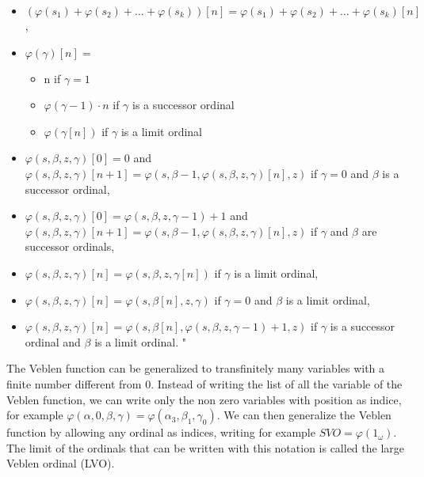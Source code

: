 \documentclass[10pt]{article}
\begin{document}
\begin{itemize}
     \setlength{\itemsep}{1pt}
     \setlength{\parskip}{0pt}
     \setlength{\parsep}{0pt}

\item \((\varphi(s_1)+\varphi(s_2)+\ldots+\varphi(s_k))[n]=\varphi(s_1)+\varphi(s_2)+\ldots+\varphi(s_k)[n]\),
\item \(\varphi(\gamma)[n]=\)
\begin{itemize}
     \setlength{\itemsep}{1pt}
     \setlength{\parskip}{0pt}
     \setlength{\parsep}{0pt}
\item n if \( \gamma=1 \)
\item \(\varphi(\gamma-1)\cdot n \) if \( \gamma \) is a successor ordinal
\item \( \varphi(\gamma[n]) \) if \( \gamma \) is a limit ordinal
\end{itemize}
\item \(\varphi(s,\beta,z,\gamma)[0]=0\) and \(\varphi(s,\beta,z,\gamma)[n+1]=\varphi(s,\beta-1,\varphi(s,\beta,z,\gamma)[n],z)\) if \(\gamma=0\) and \(\beta\) is a successor ordinal,
\item \(\varphi(s,\beta,z,\gamma)[0]=\varphi(s,\beta,z,\gamma-1)+1\) and \(\varphi(s,\beta,z,\gamma)[n+1]=\varphi(s,\beta-1,\varphi(s,\beta,z,\gamma)[n],z)\) if \(\gamma\) and \(\beta\) are successor ordinals,
\item \(\varphi(s,\beta,z,\gamma)[n]=\varphi(s,\beta,z,\gamma[n])\) if \(\gamma\) is a limit ordinal,
\item \(\varphi(s,\beta,z,\gamma)[n]=\varphi(s,\beta[n],z,\gamma)\) if \(\gamma=0\) and \(\beta\) is a limit ordinal,
\item \(\varphi(s,\beta,z,\gamma)[n]=\varphi(s,\beta[n],\varphi(s,\beta,z,\gamma-1)+1,z)\) if \(\gamma\) is a successor ordinal and \(\beta\) is a limit ordinal. "

\end{itemize}

The Veblen function can be generalized to transfinitely many variables with a finite number different from 0. Instead of writing the list of all the variable of the Veblen function, we can write only the non zero variables with position as indice, for example \( \varphi(\alpha,0,\beta,\gamma) = \varphi(\alpha_3,\beta_1,\gamma_0) \). We can then generalize the Veblen function by allowing any ordinal as indices, writing for example \( SVO = \varphi(1_\omega) \). The limit of the ordinals that can be written with this notation is called the large Veblen ordinal (LVO).
\end{document}
